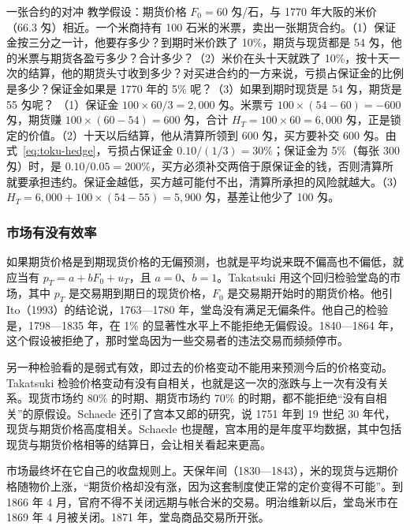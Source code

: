 \begin{example}{一张合约的对冲}\label{ex:toku-hedge}
教学假设：期货价格 $F_0=60$ 匁/石，与 1770 年大阪的米价（66.3 匁\cite{iwahashi1981}）相近。一个米商持有 100 石米的米票，卖出一张期货合约。（1）保证金按三分之一计，他要存多少？到期时米价跌了 10\%，期货与现货都是 54 匁，他的米票与期货各盈亏多少？合计多少？（2）米价在头十天就跌了 10\%，按十天一次的结算，他的期货头寸收到多少？对买进合约的一方来说，亏损占保证金的比例是多少？保证金如果是 1770 年的 5\% 呢？（3）如果到期时现货是 54 匁，期货是 55 匁呢？
\solution （1）保证金 $100\times60/3=2{,}000$ 匁。米票亏 $100\times(54-60)=-600$ 匁，期货赚 $100\times(60-54)=600$ 匁，合计 $H_T=100\times60=6{,}000$ 匁，正是锁定的价值。（2）十天以后结算，他从清算所领到 600 匁，买方要补交 600 匁。由式~\eqref{eq:toku-hedge}，亏损占保证金 $0.10/(1/3)=30\%$；保证金为 5\%（每张 300 匁）时，是 $0.10/0.05=200\%$，买方必须补交两倍于原保证金的钱，否则清算所就要承担违约。保证金越低，买方越可能付不出，清算所承担的风险就越大。（3）$H_T=6{,}000+100\times(54-55)=5{,}900$ 匁，基差让他少了 100 匁。
\end{example}

\subsubsection{市场有没有效率}
如果期货价格是到期现货价格的无偏预测，也就是平均说来既不偏高也不偏低，就应当有 $p_T=a+bF_0+u_T$，且 $a=0$、$b=1$。Takatsuki 用这个回归检验堂岛的市场，其中 $p_T$ 是交易期到期日的现货价格，$F_0$ 是交易期开始时的期货价格\cite{takatsuki2007}。他引 Ito（1993）的结论说，1763—1780 年，堂岛没有满足无偏条件。他自己的检验是，1798—1835 年，在 1\% 的显著性水平上不能拒绝无偏假设。1840—1864 年，这个假设被拒绝了，那时堂岛因为一些交易者的违法交易而频频停市\cite{takatsuki2007}。

另一种检验看的是弱式有效，即过去的价格变动不能用来预测今后的价格变动。Takatsuki 检验价格变动有没有自相关，也就是这一次的涨跌与上一次有没有关系。现货市场约 80\% 的时期、期货市场约 70\% 的时期，都不能拒绝“没有自相关”的原假设\cite{takatsuki2007}。Schaede 还引了宫本又郎的研究，说 1751 年到 19 世纪 30 年代，现货与期货价格高度相关。Schaede 也提醒，宫本用的是年度平均数据，其中包括现货与期货价格相等的结算日，会让相关看起来更高\cite{schaede1989}。

市场最终坏在它自己的收盘规则上。天保年间（1830—1843），米的现货与远期价格随物价上涨，“期货价格却没有涨，因为这套制度使正常的定价变得不可能”。到 1866 年 4 月，官府不得不关闭远期与帐合米的交易。明治维新以后，堂岛米市在 1869 年 4 月被关闭\cite{schaede1989}。1871 年，堂岛商品交易所开张\cite{schaede1989}。

